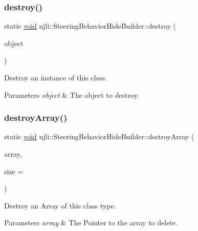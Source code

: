 \subsubsection{\texorpdfstring{destroy()}{destroy()}}
{\footnotesize\ttfamily static \mbox{\hyperlink{_thread_8h_af1e856da2e658414cb2456cb6f7ebc66}{void}} njli\+::\+Steering\+Behavior\+Hide\+Builder\+::destroy (\begin{DoxyParamCaption}\item[{\mbox{\hyperlink{classnjli_1_1_steering_behavior_hide_builder}{Steering\+Behavior\+Hide\+Builder}} $\ast$}]{object }\end{DoxyParamCaption})\hspace{0.3cm}{\ttfamily [static]}}

Destroy an instance of this class.


\begin{DoxyParams}{Parameters}
{\em object} & The object to destroy. \\
\hline
\end{DoxyParams}
\mbox{\label{classnjli_1_1_steering_behavior_hide_builder_a123b26cb4024dab53211d3b463ada206}} 
\subsubsection{\texorpdfstring{destroy\+Array()}{destroyArray()}}
{\footnotesize\ttfamily static \mbox{\hyperlink{_thread_8h_af1e856da2e658414cb2456cb6f7ebc66}{void}} njli\+::\+Steering\+Behavior\+Hide\+Builder\+::destroy\+Array (\begin{DoxyParamCaption}\item[{\mbox{\hyperlink{classnjli_1_1_steering_behavior_hide_builder}{Steering\+Behavior\+Hide\+Builder}} $\ast$$\ast$}]{array,  }\item[{const \mbox{\hyperlink{_util_8h_a10e94b422ef0c20dcdec20d31a1f5049}{u32}}}]{size = {} }\end{DoxyParamCaption})\hspace{0.3cm}{\ttfamily [static]}}

Destroy an Array of this class type.


\begin{DoxyParams}{Parameters}
{\em array} & The Pointer to the array to delete. \\
\hline
\end{DoxyParams}
\mbox{\label{classnjli_1_1_steering_behavior_hide_builder_a63ec8fd65ed7f2242f66a309459a7f99}} 
